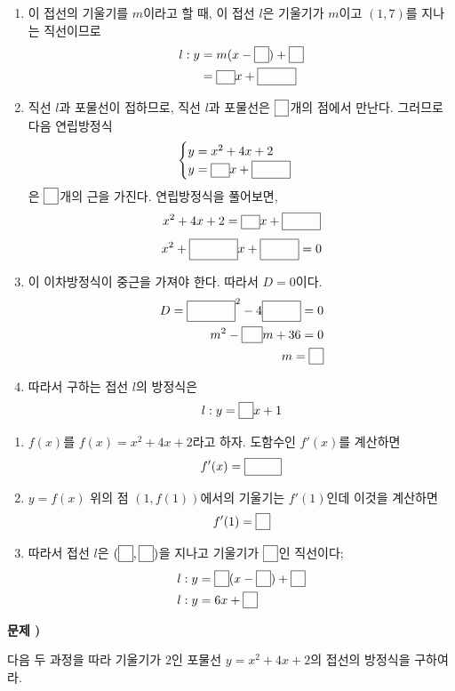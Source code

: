 \documentclass[a4paper]{oblivoir}
\newcounter{num}
\newcommand\prob[1]
{\bigskip\par\noindent\stepcounter{num} \textbf{문제 \thenum) #1}\par\noindent}
\newcommand\pb[1]{\ensuremath{\fbox{\phantom{#1}}}}
\begin{document}
\noindent{}
\begin{enumerate}[(1)]
\item
이 접선의 기울기를 \(m\)이라고 할 때, 이 접선 \(l\)은 기울기가 \(m\)이고 \((1,7)\)를 지나는 직선이므로
\begin{align*}
l:y&=m(x-\pb1)+\pb7\\
&=\pb mx+\pb{-m+7}
\end{align*}
\item
직선 \(l\)과 포물선이 접하므로, 직선 \(l\)과 포물선은 \pb{1}개의 점에서 만난다.
그러므로 다음 연립방정식
\[
\begin{cases}
y=x^2+4x+2\\
y=\pb mx+\pb{-m+7}
\end{cases}
\]
은 \pb{1}개의 근을 가진다.
연립방정식을 풀어보면,
\[x^2+4x+2=\pb mx+\pb{-m+7}\]
\[x^2+\pb{(-m+4)}x+\pb{(m-5)}=0\]
\item
이 이차방정식이 중근을 가져야 한다.
따라서 \(D=0\)이다.
\begin{align*}
D=\pb{(-m+4)}^2-4\pb{(m-5)}=0\\
m^2-\pb{12}m+36=0\\
m=\pb6
\end{align*}
\item
따라서 구하는 접선 \(l\)의 방정식은
\[l:y=\pb6x+1\]
\end{enumerate}

\noindent{}
\begin{enumerate}[(1)]
\item
\(f(x)\)를 \(f(x)=x^2+4x+2\)라고 하자.
도함수인 \(f'(x)\)를 계산하면
\[f'(x)=\pb{2x+4}\]
\item
\(y=f(x)\) 위의 점 \((1,f(1))\)에서의 기울기는 \(f'(1)\)인데 이것을 계산하면
\[f'(1)=\pb6\]
\item
따라서 접선 \(l\)은 \((\pb1,\pb7)\)을 지나고 기울기가 \pb6인 직선이다;
\begin{align*}
l:y&=\pb6(x-\pb1)+\pb7\\
l:y&=6x+\pb1
\end{align*}
\end{enumerate}

%
\prob{}\label{type2}
다음 두 과정을 따라 기울기가 \(2\)인 포물선 \(y=x^2+4x+2\)의 접선의 방정식을 구하여라.
\end{document}
